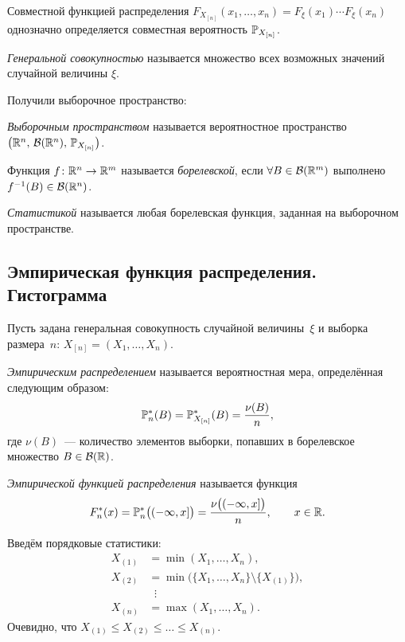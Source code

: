 Совместной функцией распределения
$F_{X_{[n]}}(x_1, \ldots, x_n) = F_\xi(x_1) \cdots F_\xi(x_n)$
однозначно определяется совместная вероятность $\P_{X_{[n]}}$.

\begin{definition}
  \emph{Генеральной совокупностью} называется множество всех возможных значений случайной величины $\xi$.
\end{definition}

Получили выборочное пространство:
\begin{definition}
  \emph{Выборочным пространством} называется вероятностное пространство
  $\bigl(\R^n,\, \mathcal{B}(\R^n),\, \P_{X_{[n]}}\bigr)$.
\end{definition}

\begin{reminder}
  Функция $f \colon \R^n \to \R^m$ называется \emph{борелевской}, если
  $\forall B \in \mathcal{B}(\R^m)$ выполнено $f^{-1}(B) \in \mathcal{B}(\R^n)$.
\end{reminder}

\begin{definition}
  \emph{Статистикой} называется любая борелевская функция, заданная на
  выборочном пространстве.
\end{definition}

\subsection{Эмпирическая функция распределения. Гистограмма}

Пусть задана генеральная совокупность случайной величины~$\xi$
и выборка размера~$n$: $X_{[n]} = (X_1, \ldots, X_n)$.
\begin{definition}
  \emph{Эмпирическим распределением} называется вероятностная мера,
  определённая следующим образом:
  \[
    \Pemp(B) = \P_{X_{[n]}}^{*}(B) = \frac{\nu(B)}{n},
  \]
  где $\nu(B)$~--- количество элементов выборки, попавших в борелевское множество
  $B \in \mathcal{B}(\R)$.
\end{definition}

\begin{definition}
  \emph{Эмпирической функцией распределения} называется функция
  \[
    F_n^{*}(x) = \Pemp\bigl((-\infty, x]\bigr)
    = \frac{\nu\bigl((-\infty, x]\bigr)}{n}, \qquad x \in \R.
  \]
\end{definition}

Введём порядковые статистики:
\begin{align*}
  X_{(1)} &= \min(X_1, \ldots, X_n), \\
  X_{(2)} &= \min\bigl(\{X_1, \ldots, X_n\} \setminus \{X_{(1)}\}\bigr), \\
          &\;\;\vdots \\
  X_{(n)} &= \max(X_1, \ldots, X_n).
\end{align*}
Очевидно, что $X_{(1)} \le X_{(2)} \le \ldots \le X_{(n)}$.

